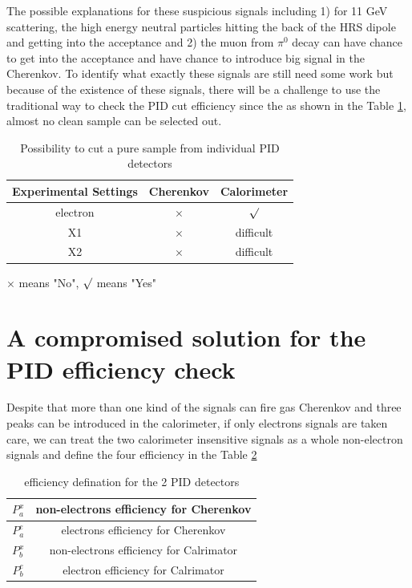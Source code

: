 The possible explanations for these suspicious signals including 1) for 11 GeV scattering, the high energy neutral particles hitting the back of the HRS dipole and getting into the acceptance and 2) the muon from $\pi^{0}$ decay can have chance to get into the acceptance and have chance to introduce big signal in the Cherenkov. To identify what exactly these signals are still need some work but because of the existence of these signals, there will be a challenge to use the traditional way to check the PID cut efficiency since the as shown in the Table \ref{sample1}, almost no clean sample can be selected out. 
\begin{table}[!ht]
\large
\centering
 \caption{Possibility to cut a pure sample from individual PID detectors}\label{tab:tablenotes}
\begin{threeparttable}
\begin{tabular}[t]{|c|c|c|}\hline
  Experimental Settings & Cherenkov & Calorimeter  \\ \hline        
  electron          &   $\times$ & $\surd$ \\ \hline
  X1                 &  $\times$  & difficult \\  \hline
 X2                  & $\times$  &   difficult\\  \hline  

 \end{tabular}
\begin{tablenotes}
\centering
        \item[1]  $ \times $ means "No", $ \surd $ means "Yes"
 \end{tablenotes}
\end{threeparttable}
\label{sample1} 
 \end{table}
\section{A compromised solution for the PID efficiency check}
Despite that more than one kind of the signals can fire gas Cherenkov and three peaks can be introduced in the calorimeter, if only electrons signals are taken care, we can treat the two calorimeter insensitive signals as a whole non-electron signals and define the four efficiency  in the Table \ref{eff1} 

\begin{table}[!ht]
\large
\centering
 \caption{efficiency defination for the 2 PID detectors}\label{tab:tablenotes}
\begin{tabular}[t]{|c|c|}\hline
   
  $P_{a}^{x}$          &   non-electrons efficiency for Cherenkov \\ \hline
  $P_{a}^{e}$                  &  electrons efficiency for Cherenkov \\  \hline
  $P_{b}^{x}$                 & non-electrons efficiency for Calrimator \\  \hline  
  $P_{b}^{e}$          &    electron efficiency for Calrimator \\  \hline

 \end{tabular}
 \label{eff1}
 \end{table}

